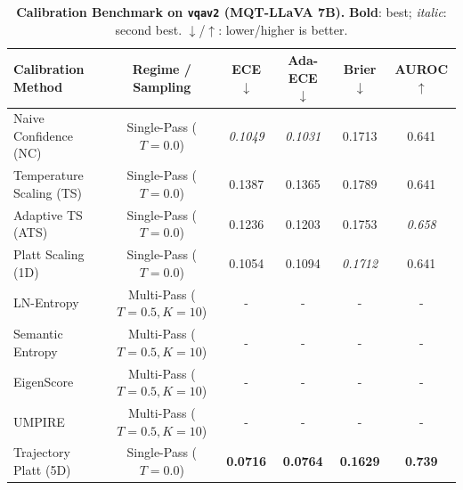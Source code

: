 \begin{table}[t]
\setlength{\tabcolsep}{4pt}
\renewcommand{\arraystretch}{1.05}
\centering
\footnotesize
\begin{tabular}{lccccc}
\toprule
\textbf{Calibration Method} & \textbf{Regime / Sampling} & \textbf{ECE} $\downarrow$ & \textbf{Ada-ECE} $\downarrow$ & \textbf{Brier} $\downarrow$ & \textbf{AUROC} $\uparrow$ \\
\midrule
Naive Confidence (NC) & Single-Pass ($T = 0.0$) & \textit{0.1049} & \textit{0.1031} & 0.1713 & 0.641 \\
Temperature Scaling (TS) & Single-Pass ($T = 0.0$) & 0.1387 & 0.1365 & 0.1789 & 0.641 \\
Adaptive TS (ATS) & Single-Pass ($T = 0.0$) & 0.1236 & 0.1203 & 0.1753 & \textit{0.658} \\
Platt Scaling (1D) & Single-Pass ($T = 0.0$) & 0.1054 & 0.1094 & \textit{0.1712} & 0.641 \\
LN-Entropy & Multi-Pass ($T = 0.5, K = 10$) & - & - & - & - \\
Semantic Entropy & Multi-Pass ($T = 0.5, K = 10$) & - & - & - & - \\
EigenScore & Multi-Pass ($T = 0.5, K = 10$) & - & - & - & - \\
UMPIRE & Multi-Pass ($T = 0.5, K = 10$) & - & - & - & - \\
Trajectory Platt (5D) & Single-Pass ($T = 0.0$) & \textbf{0.0716} & \textbf{0.0764} & \textbf{0.1629} & \textbf{0.739} \\
\bottomrule
\end{tabular}
\caption{\textbf{Calibration Benchmark on \texttt{vqav2} (MQT-LLaVA 7B).} \textbf{Bold}: best; \textit{italic}: second best. $\downarrow$/$\uparrow$: lower/higher is better.}
\label{tab:benchmark_mqt_vqav2}
\end{table}

